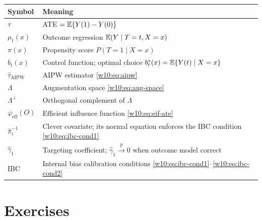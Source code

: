 \documentclass[master.tex]{subfiles}
\begin{document}
\begin{tcolorbox}[defstyle, title={Key Objects in This Chapter}]
\begin{center}
\renewcommand{\arraystretch}{1.4}
\begin{tabular}{lp{8.5cm}}
\hline
\textbf{Symbol} & \textbf{Meaning} \\
\hline
$\tau$               & ATE $= \mathbb{E}\{Y(1)-Y(0)\}$ \\
$\mu_t(x)$           & Outcome regression $\mathbb{E}(Y\mid T=t,X=x)$ \\
$\pi(x)$             & Propensity score $P(T=1\mid X=x)$ \\
$b_t(x)$             & Control function; optimal choice $b_t^*(x)=\mathbb{E}\{Y(t)\mid X=x\}$ \\
$\hat\tau_{\mathrm{AIPW}}$ & AIPW estimator \eqref{w10:eq:aipw} \\
$\Lambda$            & Augmentation space \eqref{w10:eq:aug-space} \\
$\Lambda^\perp$      & Orthogonal complement of $\Lambda$ \\
$\varphi_{\mathrm{eff}}(O)$ & Efficient influence function \eqref{w10:eq:eif-ate} \\
$\hat\pi_i^{-1}$     & Clever covariate; its normal equation enforces the IBC condition \eqref{w10:eq:ibc-cond1} \\
$\hat\gamma_1$       & Targeting coefficient; $\hat\gamma_1\overset{p}{\to}0$ when outcome model correct \\
IBC                  & Internal bias calibration conditions \eqref{w10:eq:ibc-cond1}--\eqref{w10:eq:ibc-cond2} \citep{firth1998robust} \\
\hline
\end{tabular}
\end{center}
\end{tcolorbox}

\section*{Exercises}
\label{w10:sec:exercises}
\end{document}
